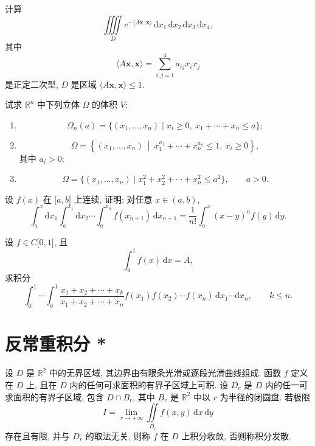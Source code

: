 \documentclass[../数学分析培优讲义.tex]{subfiles}
\begin{document}
\begin{example}
计算
\[
    \iiiint\limits_De^{-\langle A\bm{x},\bm{x}\rangle}\,
    \mathrm{d}x_1\,\mathrm{d}x_2\,\mathrm{d}x_3\,\mathrm{d}x_4,
\]
其中
\[
    \langle A\bm{x},\bm{x}\rangle=\sum\limits_{i,j=1}^4a_{ij}x_ix_j
\]
是正定二次型, $D$ 是区域 $\langle A\bm{x},\bm{x}\rangle\leq1$.
\end{example}
\exampleblank

\begin{example}
试求 $\mathbb{R}^n$ 中下列立体 $\Omega$ 的体积 $V$:
\begin{enumerate}[label=(\arabic*)]
    \item
    \[
        \Omega_n(a)=\{(x_1,\ldots,x_n)\mid x_i\geq0,\ x_1+\cdots+x_n\leq a\};
    \]
    \item
    \[
        \Omega=\left\{(x_1,\ldots,x_n)\ \middle|\ x_1^{a_1}+\cdots+x_n^{a_n}\leq1,\ x_i\geq0\right\},
    \]
    其中 $a_i>0$;
    \item
    \[
        \Omega=\{(x_1,\ldots,x_n)\mid x_1^2+x_2^2+\cdots+x_n^2\leq a^2\},\qquad a>0.
    \]
\end{enumerate}
\end{example}
\exampleblank

\begin{example}
设 $f(x)$ 在 $\lbrack a,b\rbrack$ 上连续, 证明: 对任意 $x\in(a,b)$,
\[
    \int_a^x\mathrm{d}x_1\int_a^{x_1}\mathrm{d}x_2\cdots\int_a^{x_n}f(x_{n+1})\,\mathrm{d}x_{n+1}
    =\dfrac{1}{n!}\int_a^x(x-y)^nf(y)\,\mathrm{d}y.
\]
\end{example}
\exampleblank

\begin{example}
设 $f\in C\lbrack0,1\rbrack$, 且
\[
    \int_0^1f(x)\,\mathrm{d}x=A,
\]
求积分
\[
    \int_0^1\cdots\int_0^1
    \dfrac{x_1+x_2+\cdots+x_k}{x_1+x_2+\cdots+x_n}
    f(x_1)f(x_2)\cdots f(x_n)
    \,\mathrm{d}x_1\cdots\mathrm{d}x_n,
    \qquad k\leq n.
\]
\end{example}
\exampleblank


\newpage

\section{反常重积分 *}

\begin{definition}[无界区域]
设 $D$ 是 $\mathbb{R}^2$ 中的无界区域, 其边界由有限条光滑或逐段光滑曲线组成. 函数 $f$ 定义在 $D$ 上, 且在 $D$ 内的任何可求面积的有界子区域上可积. 设 $D_r$ 是 $D$ 内的任一可求面积的有界子区域, 包含 $D\cap B_r$, 其中 $B_r$ 是 $\mathbb{R}^2$ 中以 $r$ 为半径的闭圆盘. 若极限
\[
    I=\lim\limits_{r\to+\infty}\iint\limits_{D_r}f(x,y)\,\mathrm{d}x\,\mathrm{d}y
\]
存在且有限, 并与 $D_r$ 的取法无关, 则称 $f$ 在 $D$ 上积分收敛, 否则称积分发散.
\end{definition}
\end{document}
